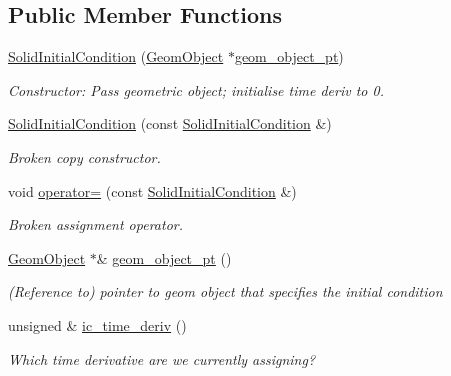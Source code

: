\subsection*{Public Member Functions}
\begin{DoxyCompactItemize}
\item 
\hyperlink{classoomph_1_1SolidInitialCondition_acbadca9acd23896ac9a83a122784f451}{Solid\+Initial\+Condition} (\hyperlink{classoomph_1_1GeomObject}{Geom\+Object} $\ast$\hyperlink{classoomph_1_1SolidInitialCondition_a441ecb1f0511a77b14d11e1225484a46}{geom\+\_\+object\+\_\+pt})
\begin{DoxyCompactList}\small\item\em Constructor\+: Pass geometric object; initialise time deriv to 0. \end{DoxyCompactList}\item 
\hyperlink{classoomph_1_1SolidInitialCondition_aac6769fc4973ea1862c50df8a4ca6536}{Solid\+Initial\+Condition} (const \hyperlink{classoomph_1_1SolidInitialCondition}{Solid\+Initial\+Condition} \&)
\begin{DoxyCompactList}\small\item\em Broken copy constructor. \end{DoxyCompactList}\item 
void \hyperlink{classoomph_1_1SolidInitialCondition_ab746fd596b28c65865a9349b08ca5d6b}{operator=} (const \hyperlink{classoomph_1_1SolidInitialCondition}{Solid\+Initial\+Condition} \&)
\begin{DoxyCompactList}\small\item\em Broken assignment operator. \end{DoxyCompactList}\item 
\hyperlink{classoomph_1_1GeomObject}{Geom\+Object} $\ast$\& \hyperlink{classoomph_1_1SolidInitialCondition_a441ecb1f0511a77b14d11e1225484a46}{geom\+\_\+object\+\_\+pt} ()
\begin{DoxyCompactList}\small\item\em (Reference to) pointer to geom object that specifies the initial condition \end{DoxyCompactList}\item 
unsigned \& \hyperlink{classoomph_1_1SolidInitialCondition_ad1fcd02e1af7c0d22f871e5f968ee5e0}{ic\+\_\+time\+\_\+deriv} ()
\begin{DoxyCompactList}\small\item\em Which time derivative are we currently assigning? \end{DoxyCompactList}\end{DoxyCompactItemize}
